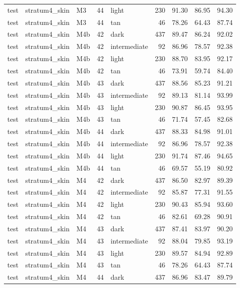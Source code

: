 \begin{tabular}{lllrlrrrr}
test & stratum4\_skin & M3 & 44 & light & 230 & 91.30 & 86.95 & 94.30 \\
test & stratum4\_skin & M3 & 44 & tan & 46 & 78.26 & 64.43 & 87.74 \\
test & stratum4\_skin & M4b & 42 & dark & 437 & 89.47 & 86.24 & 92.02 \\
test & stratum4\_skin & M4b & 42 & intermediate & 92 & 86.96 & 78.57 & 92.38 \\
test & stratum4\_skin & M4b & 42 & light & 230 & 88.70 & 83.95 & 92.17 \\
test & stratum4\_skin & M4b & 42 & tan & 46 & 73.91 & 59.74 & 84.40 \\
test & stratum4\_skin & M4b & 43 & dark & 437 & 88.56 & 85.23 & 91.21 \\
test & stratum4\_skin & M4b & 43 & intermediate & 92 & 89.13 & 81.14 & 93.99 \\
test & stratum4\_skin & M4b & 43 & light & 230 & 90.87 & 86.45 & 93.95 \\
test & stratum4\_skin & M4b & 43 & tan & 46 & 71.74 & 57.45 & 82.68 \\
test & stratum4\_skin & M4b & 44 & dark & 437 & 88.33 & 84.98 & 91.01 \\
test & stratum4\_skin & M4b & 44 & intermediate & 92 & 86.96 & 78.57 & 92.38 \\
test & stratum4\_skin & M4b & 44 & light & 230 & 91.74 & 87.46 & 94.65 \\
test & stratum4\_skin & M4b & 44 & tan & 46 & 69.57 & 55.19 & 80.92 \\
test & stratum4\_skin & M4 & 42 & dark & 437 & 86.50 & 82.97 & 89.39 \\
test & stratum4\_skin & M4 & 42 & intermediate & 92 & 85.87 & 77.31 & 91.55 \\
test & stratum4\_skin & M4 & 42 & light & 230 & 90.43 & 85.94 & 93.60 \\
test & stratum4\_skin & M4 & 42 & tan & 46 & 82.61 & 69.28 & 90.91 \\
test & stratum4\_skin & M4 & 43 & dark & 437 & 87.41 & 83.97 & 90.20 \\
test & stratum4\_skin & M4 & 43 & intermediate & 92 & 88.04 & 79.85 & 93.19 \\
test & stratum4\_skin & M4 & 43 & light & 230 & 89.57 & 84.94 & 92.89 \\
test & stratum4\_skin & M4 & 43 & tan & 46 & 78.26 & 64.43 & 87.74 \\
test & stratum4\_skin & M4 & 44 & dark & 437 & 86.96 & 83.47 & 89.79 \\

\end{tabular}

